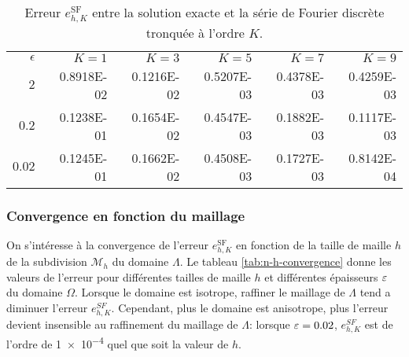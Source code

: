 \begin{table}
  \caption{Erreur $e_{h,K}^\mathrm{SF}$ entre la solution exacte et la
    série de Fourier discrète tronquée à l'ordre $K$.}
  \label{tab:h-k-convergence}
  \begin{center}
    \begin{tabular}{@{}rrrrrr@{}}
      \toprule
      $\epsilon$   & $K = 1$ & $K = 3$ & $K = 5$ & $K = 7$ & $K = 9$\\
      \cmidrule{1-6}
      $2$      & \num{0.8918E-02} & \num{0.1216E-02} & \num{0.5207E-03} & \num{0.4378E-03} & \num{0.4259E-03} \\
      $0.2$    & \num{0.1238E-01} & \num{0.1654E-02} & \num{0.4547E-03} & \num{0.1882E-03} & \num{0.1117E-03} \\
      $0.02$   & \num{0.1245E-01} & \num{0.1662E-02} & \num{0.4508E-03} & \num{0.1727E-03} & \num{0.8142E-04} \\
      \bottomrule
    \end{tabular}
  \end{center}
\end{table}


\subsubsection{Convergence en fonction du maillage}
On s'intéresse à la convergence de l'erreur $e_{h,K}^\mathrm{SF}$ en
fonction de la taille de maille $h$ de la subdivision $\mathcal M_h$
du domaine $\Lambda$. Le tableau \ref{tab:n-h-convergence} donne les
valeurs de l'erreur pour différentes tailles de maille $h$ et
différentes épaisseurs $\varepsilon$ du domaine $\Omega$.  Lorsque le
domaine est isotrope, raffiner le maillage de $\Lambda$ tend a
diminuer l'erreur $e_{h, K}^{SF}$. Cependant, plus le domaine est
anisotrope, plus l'erreur devient insensible au raffinement du
maillage de $\Lambda$: lorsque $\varepsilon = \num{0.02}$,
$e_{h,K}^{SF}$ est de l'ordre de \num{1e-4} quel que soit la valeur de
$h$.

